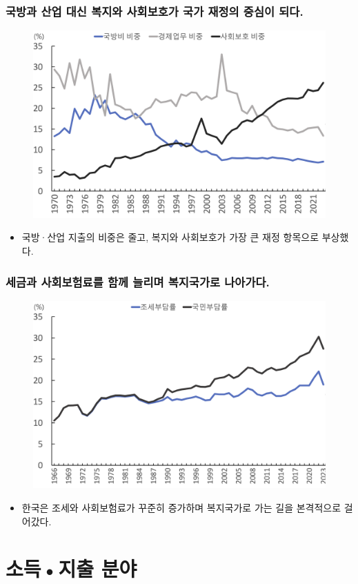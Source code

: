 \documentclass[aspectratio=169,xcolor=dvipsnames,handout]{beamer}
\begin{document}
\begin{frame}[<+->]
\frametitle{국방과 산업 대신 복지와 사회보호가 국가 재정의 중심이 되다.}
    \begin{figure}
        \centering
        \includegraphics[width=.5\textwidth]{pic/fig_econ_11.png}
    \end{figure}
    \begin{itemize}
        \item  국방·산업 지출의 비중은 줄고, 복지와 사회보호가 가장 큰 재정 항목으로 부상했다.
    \end{itemize}
\end{frame}

\begin{frame}[<+->]
\frametitle{세금과 사회보험료를 함께 늘리며 복지국가로 나아가다.}
    \begin{figure}
        \centering
        \includegraphics[width=.5\textwidth]{pic/fig_econ_12.png}
    \end{figure}
    \begin{itemize}
        \item 한국은 조세와 사회보험료가 꾸준히 증가하며 복지국가로 가는 길을 본격적으로 걸어갔다.
    \end{itemize}
\end{frame}

\section{소득•지출 분야}
\end{document}
